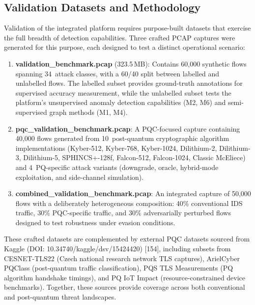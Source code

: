 \documentclass[12pt,a4paper]{article}
\begin{document}
\subsection{Validation Datasets and Methodology}
\label{subsec:validation-datasets}

Validation of the integrated platform requires purpose-built datasets
that exercise the full breadth of detection capabilities.  Three
crafted PCAP captures were generated for this purpose, each designed
to test a distinct operational scenario:

\begin{enumerate}
    \item \textbf{validation\_benchmark.pcap} (323.5\,MB): Contains
    60{,}000 synthetic flows spanning 34~attack classes, with a
    60/40 split between labelled and unlabelled flows.  The labelled
    subset provides ground-truth annotations for supervised accuracy
    measurement, while the unlabelled subset tests the platform's
    unsupervised anomaly detection capabilities (M2, M6) and
    semi-supervised graph methods (M1, M4).

    \item \textbf{pqc\_validation\_benchmark.pcap}: A PQC-focused
    capture containing 40{,}000 flows generated from 10~post-quantum
    cryptographic algorithm implementations (Kyber-512, Kyber-768,
    Kyber-1024, Dilithium-2, Dilithium-3, Dilithium-5, SPHINCS+-128f,
    Falcon-512, Falcon-1024, Classic McEliece) and 4~PQ-specific
    attack variants (downgrade, oracle, hybrid-mode exploitation, and
    side-channel simulation).

    \item \textbf{combined\_validation\_benchmark.pcap}: An integrated
    capture of 50{,}000 flows with a deliberately heterogeneous
    composition: 40\% conventional IDS traffic, 30\% PQC-specific
    traffic, and 30\% adversarially perturbed flows designed to test
    robustness under evasion conditions.
\end{enumerate}

These crafted datasets are complemented by external PQC datasets
sourced from Kaggle (DOI: 10.34740/kaggle/dsv/15424420) [154],
including subsets from CESNET-TLS22 (Czech national research network
TLS captures), ArielCyber PQClass (post-quantum traffic
classification), PQS TLS Measurements (PQ algorithm handshake
timings), and PQ IoT Impact (resource-constrained device
benchmarks).  Together, these sources provide coverage across both
conventional and post-quantum threat landscapes.
\end{document}
